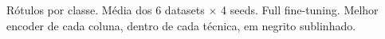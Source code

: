 \begin{table}[htbp]
\centering
\small
\caption{Centralizado: acurácia (\%) por técnica, regime de rótulo e encoder}
\label{tab:t2_centralizado_regime}

\par\vspace{2pt}\footnotesize Rótulos por classe. Média dos 6 datasets $\times$ 4 seeds. Full fine-tuning. Melhor encoder de cada coluna, dentro de cada técnica, em negrito sublinhado.
\end{table}
